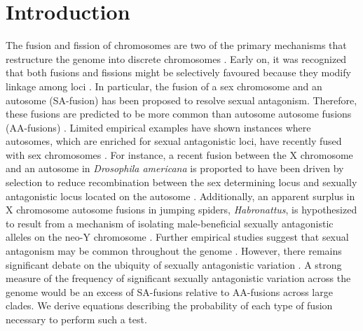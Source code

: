 \documentclass[12pt]{article}
\begin{document}
\section{Introduction}
The fusion and fission of chromosomes are two of the primary mechanisms that restructure the genome into discrete chromosomes \citep{blackmon2019}.
Early on, it was recognized that both fusions and fissions might be selectively favoured because they modify linkage among loci \citep{white1977,stebbins1971}.
In particular, the fusion of a sex chromosome and an autosome (SA-fusion) has been proposed to resolve sexual antagonism. Therefore, these fusions are predicted to be more common than autosome autosome fusions (AA-fusions) \citep{charlesworth1980}.
Limited empirical examples have shown instances where autosomes, which are enriched for sexual antagonistic loci, have recently fused with sex chromosomes \citep{zhou2012}.
For instance, a recent fusion between the X chromosome and an autosome in \textit{Drosophila americana} is proported to have been driven by selection to reduce recombination between the sex determining locus and sexually antagonistic locus located on the autosome \citep{mcallister2003}.
Additionally, an apparent surplus in X chromosome autosome fusions in jumping spiders, \textit{Habronattus}, is hypothesized to result from a mechanism of isolating male-beneficial sexually antagonistic alleles on the neo-Y chromosome \citep{maddison2013}.
Further empirical studies suggest that sexual antagonism may be common throughout the genome \citep{innocenti2010sexually,cheng2016sex}.
However, there remains significant debate on the ubiquity of sexually antagonistic variation \citep{kasimatis2019limits,ponnikas2018sex}.
A strong measure of the frequency of significant sexually antagonistic variation across the genome would be an excess of SA-fusions relative to AA-fusions across large clades.
We derive equations describing the probability of each type of fusion necessary to perform such a test.

\end{document}
